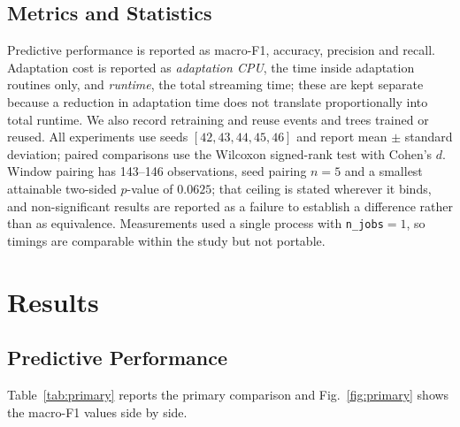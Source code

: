 \documentclass[conference]{IEEEtran}
\begin{document}
\subsection{Metrics and Statistics}
Predictive performance is reported as macro-F1, accuracy, precision and recall.
Adaptation cost is reported as \emph{adaptation CPU}, the time inside adaptation
routines only, and \emph{runtime}, the total streaming time; these are kept separate
because a reduction in adaptation time does not translate proportionally into total
runtime. We also record retraining and reuse events and trees trained or reused. All
experiments use seeds $[42, 43, 44, 45, 46]$ and report mean $\pm$ standard
deviation; paired comparisons use the Wilcoxon signed-rank test with Cohen's $d$.
Window pairing has 143--146 observations, seed pairing $n=5$ and a smallest attainable
two-sided $p$-value of $0.0625$; that ceiling is stated wherever it binds, and
non-significant results are reported as a failure to establish a difference rather
than as equivalence. Measurements used a single process with \texttt{n\_jobs}$=1$,
so timings are comparable within the study but not portable.

\section{Results}

\subsection{Predictive Performance}
Table~\ref{tab:primary} reports the primary comparison and
Fig.~\ref{fig:primary} shows the macro-F1 values side by side.
\end{document}
